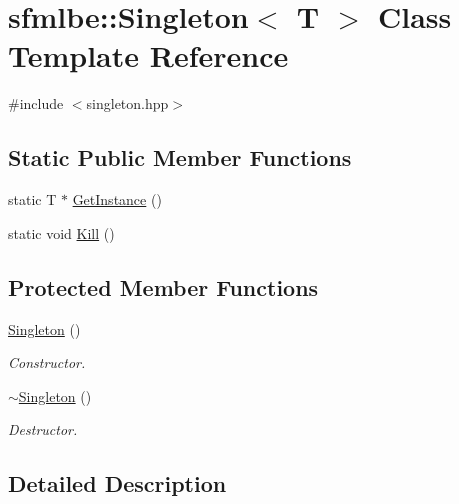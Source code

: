 \hypertarget{classsfmlbe_1_1_singleton}{}\section{sfmlbe\+:\+:Singleton$<$ T $>$ Class Template Reference}
\label{classsfmlbe_1_1_singleton}


{\ttfamily \#include $<$singleton.\+hpp$>$}

\subsection*{Static Public Member Functions}
\begin{DoxyCompactItemize}
\item 
static T $\ast$ \mbox{\hyperlink{classsfmlbe_1_1_singleton_a313529b2a097425bf5500df8848ead3e}{Get\+Instance}} ()
\item 
static void \mbox{\hyperlink{classsfmlbe_1_1_singleton_a0fa947a0f0940b94f757e49b56f37555}{Kill}} ()
\end{DoxyCompactItemize}
\subsection*{Protected Member Functions}
\begin{DoxyCompactItemize}
\item 
\mbox{\label{classsfmlbe_1_1_singleton_a3f47ec090e5341446601408f9d38b467}} 
\mbox{\hyperlink{classsfmlbe_1_1_singleton_a3f47ec090e5341446601408f9d38b467}{Singleton}} ()
\begin{DoxyCompactList}\small\item\em Constructor. \end{DoxyCompactList}\item 
\mbox{\label{classsfmlbe_1_1_singleton_aa99901d754398a178b10e72fcc582b80}} 
\mbox{\hyperlink{classsfmlbe_1_1_singleton_aa99901d754398a178b10e72fcc582b80}{$\sim$\+Singleton}} ()
\begin{DoxyCompactList}\small\item\em Destructor. \end{DoxyCompactList}\end{DoxyCompactItemize}


\subsection{Detailed Description}

